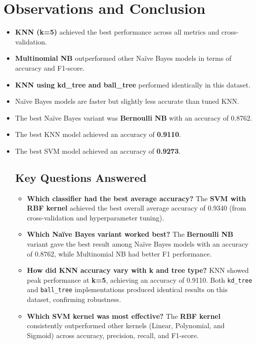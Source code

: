\documentclass[12pt]{article}
\begin{document}
\newpage
\section*{Observations and Conclusion}
\begin{itemize}
  \item \textbf{KNN (k=5)} achieved the best performance across all metrics and cross-validation.
  \item \textbf{Multinomial NB} outperformed other Naïve Bayes models in terms of accuracy and F1-score.
  \item \textbf{KNN using kd\_tree and ball\_tree} performed identically in this dataset.
  \item Naïve Bayes models are faster but slightly less accurate than tuned KNN.
  \item The best Naïve Bayes variant was \textbf{Bernoulli NB} with an accuracy of 0.8762.
  \item The best KNN model achieved an accuracy of \textbf{0.9110}.
  \item The best SVM model achieved an accuracy of \textbf{0.9273}.

\subsection*{Key Questions Answered}
\begin{itemize}
  \item \textbf{Which classifier had the best average accuracy?}  
  The \textbf{SVM with RBF kernel} achieved the best overall average accuracy of 0.9340 (from cross-validation and hyperparameter tuning).

  \item \textbf{Which Naïve Bayes variant worked best?}  
  The \textbf{Bernoulli NB} variant gave the best result among Naïve Bayes models with an accuracy of 0.8762, while Multinomial NB had better F1 performance.

  \item \textbf{How did KNN accuracy vary with k and tree type?}  
  KNN showed peak performance at \textbf{k=5}, achieving an accuracy of 0.9110. Both \texttt{kd\_tree} and \texttt{ball\_tree} implementations produced identical results on this dataset, confirming robustness.

  \item \textbf{Which SVM kernel was most effective?}  
  The \textbf{RBF kernel} consistently outperformed other kernels (Linear, Polynomial, and Sigmoid) across accuracy, precision, recall, and F1-score.


\end{itemize}
\end{itemize}
\end{document}
